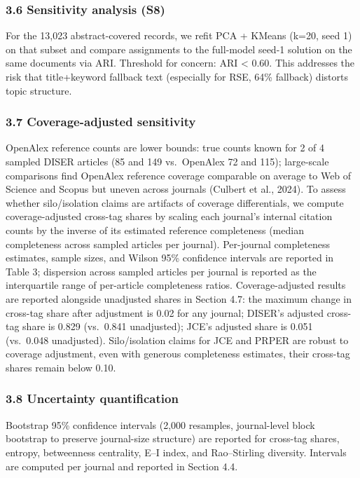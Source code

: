 \documentclass[pdflatex,sn-apa]{sn-jnl}
\begin{document}
\subsubsection{3.6 Sensitivity analysis
(S8)}\label{sensitivity-analysis-s8}

For the 13,023 abstract-covered records, we refit PCA + KMeans (k=20,
seed 1) on that subset and compare assignments to the full-model seed-1
solution on the same documents via ARI. Threshold for concern: ARI
\textless{} 0.60. This addresses the risk that title+keyword fallback
text (especially for RSE, 64\% fallback) distorts topic structure.

\subsubsection{3.7 Coverage-adjusted
sensitivity}\label{coverage-adjusted-sensitivity}

OpenAlex reference counts are lower bounds: true counts known for 2 of 4
sampled DISER articles (85 and 149 vs.~OpenAlex 72 and 115); large-scale
comparisons find OpenAlex reference coverage comparable on average to
Web of Science and Scopus but uneven across journals (Culbert et al.,
2024). To assess whether silo/isolation claims are artifacts of coverage
differentials, we compute coverage-adjusted cross-tag shares by scaling
each journal's internal citation counts by the inverse of its estimated
reference completeness (median completeness across sampled articles per
journal). Per-journal completeness estimates, sample sizes, and Wilson
95\% confidence intervals are reported in Table 3; dispersion across
sampled articles per journal is reported as the interquartile range of
per-article completeness ratios. Coverage-adjusted results are reported
alongside unadjusted shares in Section 4.7: the maximum change in
cross-tag share after adjustment is 0.02 for any journal; DISER's
adjusted cross-tag share is 0.829 (vs.~0.841 unadjusted); JCE's adjusted
share is 0.051 (vs.~0.048 unadjusted). Silo/isolation claims for JCE and
PRPER are robust to coverage adjustment, even with generous completeness
estimates, their cross-tag shares remain below 0.10.

\subsubsection{3.8 Uncertainty
quantification}\label{uncertainty-quantification}

Bootstrap 95\% confidence intervals (2,000 resamples, journal-level
block bootstrap to preserve journal-size structure) are reported for
cross-tag shares, entropy, betweenness centrality, E--I index, and
Rao--Stirling diversity. Intervals are computed per journal and reported
in Section 4.4.
\end{document}
